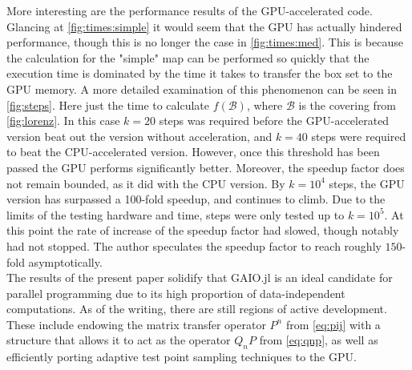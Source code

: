 More interesting are the performance results of the GPU-accelerated code. Glancing at 
\autoref{fig:times:simple} it would seem that the GPU has actually hindered 
performance, though this is no longer the case in \autoref{fig:times:med}. This is 
because the calculation for the "simple" map can be performed so quickly that the 
execution time is dominated by the time it takes to transfer the box set to the GPU 
memory. A more detailed examination of this phenomenon can be seen in 
\autoref{fig:steps}. Here just the time to calculate $f(\mathcal{B})$, where $\mathcal{B}$
is the covering from \autoref{fig:lorenz}. In this case $k = 20$ steps was required before the 
GPU-accelerated version beat out the version without acceleration, and $k = 40$ steps were 
required to beat the CPU-accelerated version. However, once this threshold has been 
passed the GPU performs significantly better. Moreover, the speedup factor does not remain 
bounded, as it did with the CPU version. By $k = 10^4$ steps, the GPU version has 
surpassed a 100-fold speedup, and continues to climb. Due to the limits of the testing 
hardware and time, steps were only tested up to $k = 10^5$. At this point the rate of 
increase of the speedup factor had slowed, though notably had not stopped. The author 
speculates the speedup factor to reach roughly $150$-fold asymptotically. \\

The results of the present paper solidify that GAIO.jl is an ideal candidate for 
parallel programming due to its high proportion of data-independent computations. As of 
the writing, there are still regions of active development. These include endowing the 
matrix transfer operator $P^n$ from \autoref{eq:pij} with a structure that allows it to 
act as the operator $Q_n P$ from \autoref{eq:qnp}, as well as 
efficiently porting adaptive test point sampling techniques to the GPU. 

